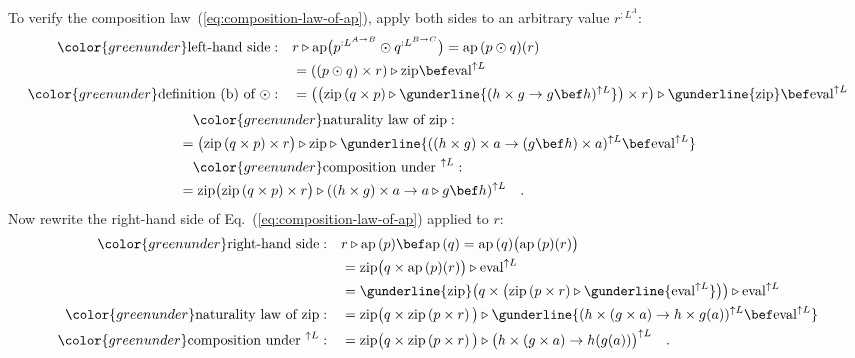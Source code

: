 To verify the composition law~(\ref{eq:composition-law-of-ap}),
apply both sides to an arbitrary value $r^{:L^{A}}$:
\begin{align*}
{\color{greenunder}\text{left-hand side}:}\quad & r\triangleright\text{ap}\big(p^{:L^{A\rightarrow B}}\odot q^{:L^{B\rightarrow C}}\big)=\text{ap}\,(p\odot q)(r)\\
 & =((p\odot q)\times r)\triangleright\text{zip}\bef\text{eval}^{\uparrow L}\\
{\color{greenunder}\text{definition (b) of }\odot:}\quad & =\big(\big(\text{zip}\left(q\times p\right)\triangleright\gunderline{(h\times g\rightarrow g\bef h)^{\uparrow L}}\big)\times r\big)\triangleright\gunderline{\text{zip}}\bef\text{eval}^{\uparrow L}
\end{align*}
\begin{align*}
 & \quad{\color{greenunder}\text{naturality law of }\text{zip}:}\quad\\
 & =\big(\text{zip}\left(q\times p\right)\times r\big)\triangleright\text{zip}\triangleright\gunderline{((h\times g)\times a\rightarrow(g\bef h)\times a)^{\uparrow L}\bef\text{eval}^{\uparrow L}}\\
 & \quad{\color{greenunder}\text{composition under }^{\uparrow L}:}\quad\\
 & =\text{zip}\big(\text{zip}\left(q\times p\right)\times r\big)\triangleright((h\times g)\times a\rightarrow a\triangleright g\bef h)^{\uparrow L}\quad.
\end{align*}
Now rewrite the right-hand side of Eq.~(\ref{eq:composition-law-of-ap})
applied to $r$:
\begin{align*}
{\color{greenunder}\text{right-hand side}:}\quad & r\triangleright\text{ap}\,(p)\bef\text{ap}\,(q)=\text{ap}\,(q)\big(\text{ap}\,(p)(r)\big)\\
 & =\text{zip}\big(q\times\text{ap}\,(p)(r)\big)\triangleright\text{eval}^{\uparrow L}\\
 & =\gunderline{\text{zip}}\big(q\times\big(\text{zip}\,(p\times r)\triangleright\gunderline{\text{eval}^{\uparrow L}}\big)\big)\triangleright\text{eval}^{\uparrow L}\\
{\color{greenunder}\text{naturality law of }\text{zip}:}\quad & =\text{zip}\big(q\times\text{zip}\left(p\times r\right)\big)\triangleright\gunderline{(h\times(g\times a)\rightarrow h\times g(a))^{\uparrow L}\bef\text{eval}^{\uparrow L}}\\
{\color{greenunder}\text{composition under }^{\uparrow L}:}\quad & =\text{zip}\big(q\times\text{zip}\left(p\times r\right)\big)\triangleright\big(h\times(g\times a)\rightarrow h(g(a))\big)^{\uparrow L}\quad.
\end{align*}
